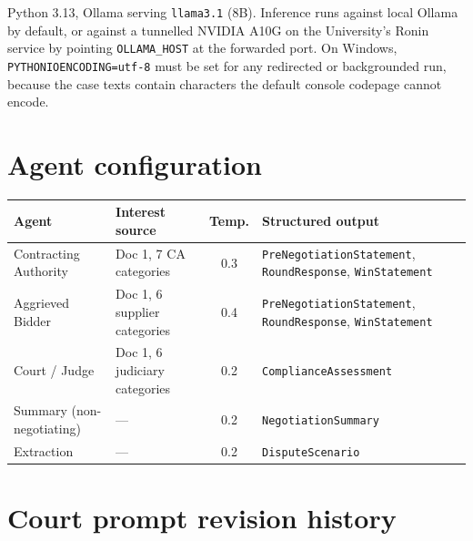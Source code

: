 Python 3.13, Ollama serving \texttt{llama3.1} (8B). Inference runs against local
Ollama by default, or against a tunnelled NVIDIA A10G on the University's Ronin
service by pointing \texttt{OLLAMA\_HOST} at the forwarded port. On Windows,
\texttt{PYTHONIOENCODING=utf-8} must be set for any redirected or backgrounded
run, because the case texts contain characters the default console codepage
cannot encode.

\section{Agent configuration}
\label{app:agent-config}

\begin{table}[htbp]
\centering
\footnotesize
\begin{tabularx}{\textwidth}{@{}>{\raggedright\arraybackslash}p{3.3cm}>{\raggedright\arraybackslash}p{3.1cm}cX@{}}
\toprule
\textbf{Agent} & \textbf{Interest source} & \textbf{Temp.} & \textbf{Structured output} \\
\midrule
Contracting Authority & Doc 1, 7 CA categories & 0.3 &
 \texttt{PreNegotiationStatement}, \texttt{RoundResponse}, \texttt{WinStatement} \\
Aggrieved Bidder & Doc 1, 6 supplier categories & 0.4 &
 \texttt{PreNegotiationStatement}, \texttt{RoundResponse}, \texttt{WinStatement} \\
Court / Judge & Doc 1, 6 judiciary categories & 0.2 &
 \texttt{ComplianceAssessment} \\
Summary (non-negotiating) & --- & 0.2 &
 \texttt{NegotiationSummary} \\
Extraction & --- & 0.2 &
 \texttt{DisputeScenario} \\
\bottomrule
\end{tabularx}
\end{table}

\section{Court prompt revision history}
\label{app:court-versions}

